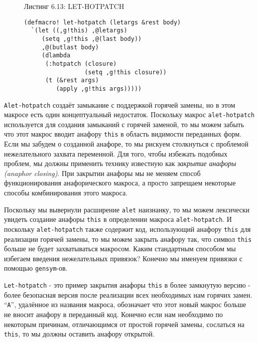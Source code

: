 \begin{figure}Листинг 6.13: LET-HOTPATCH\label{listing_6.13}
\listbegin
\begin{verbatim}
(defmacro! let-hotpatch (letargs &rest body)
  `(let ((,g!this) ,@letargs)
     (setq ,g!this ,@(last body))
     ,@(butlast body)
     (dlambda
      (:hotpatch (closure)
                 (setq ,g!this closure))
      (t (&rest args)
         (apply ,g!this args)))))
\end{verbatim}
\listend
\end{figure}

\verb"Alet-hotpatch" создаёт замыкание с поддержкой горячей замены, но в этом макросе есть один концептуальный недостаток. Поскольку макрос \verb"alet-hotpatch" используется для создания замыканий с горячей заменой, то мы можем забыть что этот макрос вводит анафору \verb"this" в область видимости переданных форм. Если мы забудем о созданной анафоре, то мы рискуем столкнуться с проблемой нежелательного захвата переменной. Для того, чтобы избежать подобных проблем, мы должны применить технику известную как \emph{закрытие анафоры (anaphor closing)}. При закрытии анафоры мы не меняем способ функционирования анафорического макроса, а просто запрещаем некоторые способы комбинирования этого макроса.

Поскольку мы вывернули расширение \verb"alet" наизнанку, то мы можем лексически увидеть создание анафоры \verb"this" в определении макроса \verb"alet-hotpatch". И поскольку \verb"alet-hotpatch" также содержит код, использующий анафору \verb"this" для реализации горячей замены, то мы можем закрыть анафору так, что символ \verb"this" больше не будет захватываться макросом. Каким стандартным способом мы избегаем введения нежелательных привязок? Конечно мы именуем привязки с помощью \verb"gensym"-ов.

\verb"Let-hotpatch" - это пример закрытия анафоры \verb"this" в более замкнутую версию - более безопасная версия после реализации всех необходимых нам горячих замен. ``\verb"A"'', удалённое из названия макроса, обозначает что этот новый макрос больше не вносит анафору в переданный код. Конечно если нам необходимо по некоторым причинам, отличающимся от простой горячей замены, сослаться на \verb"this", то мы должны оставить анафору открытой.

